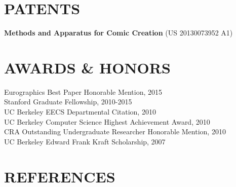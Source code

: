 \documentclass[line,margin]{res}
\begin{document}
\begin{resume}
\section{PATENTS}

\textbf{Methods and Apparatus for Comic Creation} (US 20130073952 A1)

\section{AWARDS \& HONORS}
Eurographics Best Paper Honorable Mention, 2015 \\
Stanford Graduate Fellowship, 2010-2015 \\ 
UC Berkeley EECS Departmental Citation, 2010 \\
UC Berkeley Computer Science Highest Achievement Award, 2010 \\
CRA Outstanding Undergraduate Researcher Honorable Mention, 2010 \\
UC Berkeley Edward Frank Kraft Scholarship, 2007 \\


\section{REFERENCES}

\end{resume}
\end{document}
